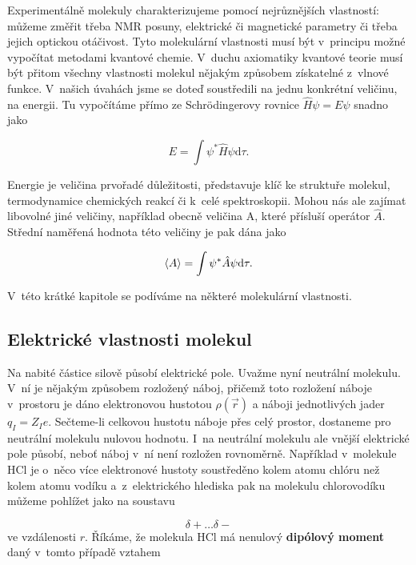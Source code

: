 Experimentálně molekuly charakterizujeme pomocí nejrůznějších vlastností: můžeme změřit třeba NMR posuny, elektrické či magnetické parametry či třeba jejich optickou otáčivost. Tyto molekulární vlastnosti musí být v~principu možné vypočítat metodami kvantové chemie. V~duchu axiomatiky kvantové teorie musí být přitom všechny vlastnosti molekul nějakým způsobem získatelné z~vlnové funkce. V~našich úvahách jsme se doteď soustředili na jednu konkrétní veličinu, na energii. Tu vypočítáme přímo ze Schr\"odingerovy rovnice $\hat{H} \psi = E \psi$ snadno jako

\begin{equation}
E = \int \psi^{\ast} \hat{H} \psi \mathrm{d} \tau.
\label{rov:Vl-1}
\end{equation}

Energie je veličina prvořadé důležitosti, představuje klíč ke struktuře molekul, termodynamice chemických reakcí či k~celé spektroskopii. Mohou nás ale zajímat libovolné jiné veličiny, například obecně veličina A, které přísluší operátor $\hat{A}$. Střední naměřená hodnota této veličiny je pak dána jako

\begin{equation}
\braket{A} = \int \psi^{\ast} \hat{A} \psi \mathrm{d} \tau.
\label{rov:Vl-2}
\end{equation}

V~této krátké kapitole se podíváme na některé molekulární vlastnosti.

  
\subsection{Elektrické vlastnosti molekul}
Na nabité částice silově působí elektrické pole. Uvažme nyní neutrální molekulu. V~ní je nějakým způsobem rozložený náboj, přičemž toto rozložení náboje v~prostoru je dáno elektronovou hustotou $\rho(\vec{r})$ a náboji jednotlivých jader $q_I=Z_I e$. Sečteme-li celkovou hustotu náboje přes celý prostor, dostaneme pro neutrální molekulu nulovou hodnotu. I~na neutrální molekulu ale vnější elektrické pole působí, neboť náboj v~ní není rozložen rovnoměrně. Například v~molekule HCl je o~něco více elektronové hustoty soustředěno kolem atomu chlóru než kolem atomu vodíku a~z~elektrického hlediska pak na molekulu chlorovodíku můžeme pohlížet jako na soustavu

\begin{equation}
\delta+ \dots \delta- \nonumber
\end{equation}
ve vzdálenosti $r$. Říkáme, že molekula HCl má nenulový \textbf{dipólový moment} daný v~tomto případě vztahem

